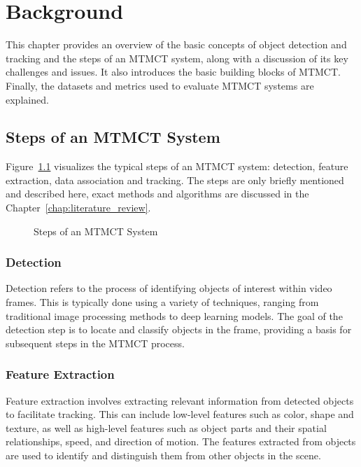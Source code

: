 \chapter{Background}\label{chap:background}
This chapter provides an overview of the basic concepts of object detection and tracking and the steps of an MTMCT system, along with a discussion of its key challenges and issues. It also introduces the basic building blocks of MTMCT. Finally, the datasets and metrics used to evaluate MTMCT systems are explained.

\section{Steps of an MTMCT System}\label{sec:steps_of_an_mtmct_system}
Figure~\ref{fig:mtmct_steps} visualizes the typical steps of an MTMCT system: detection, feature extraction, data association and tracking. The steps are only briefly mentioned and described here, exact methods and algorithms are discussed in the Chapter~\ref{chap:literature_review}.

\begin{figure}[ht]
    \centering
    
    \caption{Steps of an MTMCT System}\label{fig:mtmct_steps}
\end{figure}

\subsection{Detection}\label{subsec:detection}
Detection refers to the process of identifying objects of interest within video frames. This is typically done using a variety of techniques, ranging from traditional image processing methods to deep learning models. The goal of the detection step is to locate and classify objects in the frame, providing a basis for subsequent steps in the MTMCT process.

\subsection{Feature Extraction}\label{subsec:feature_extraction}
Feature extraction involves extracting relevant information from detected objects to facilitate tracking. This can include low-level features such as color, shape and texture, as well as high-level features such as object parts and their spatial relationships, speed, and direction of motion. The features extracted from objects are used to identify and distinguish them from other objects in the scene.

